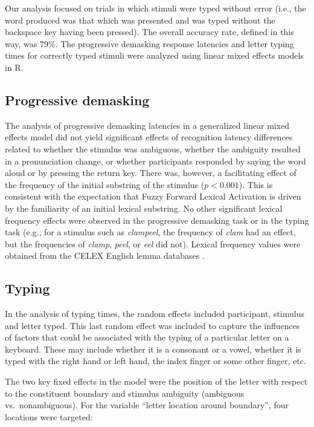 \documentclass[output=paper]{langsci/langscibook}
\begin{document}
Our analysis focused on trials in which stimuli were typed without error (i.e., the word produced was that which was presented and was typed without the backspace key having been pressed).  The overall accuracy rate, defined in this way, was 79\%. The progressive demasking response latencies and letter typing times for correctly typed stimuli were analyzed using linear mixed effects models in R.

\subsection{Progressive demasking}\label{sec:libben:3.1}

The analysis of progressive demasking latencies in a generalized linear mixed effects model did not yield significant effects of recognition latency differences related to whether the stimulus was ambiguous, whether the ambiguity resulted in a pronunciation change, or whether participants responded by saying the word aloud or by pressing the return key. There was, however, a facilitating effect of the frequency of the initial substring of the stimulus ($p<0.001$). This is consistent with the expectation that Fuzzy Forward Lexical Activation is driven by the familiarity of an initial lexical substring. No other significant lexical frequency effects were observed in the progressive demasking task or in the typing task (e.g., for a stimulus such as \textit{clampeel}, the frequency of \textit{clam} had an effect, but the frequencies of \textit{clamp}, \textit{peel}, or \textit{eel} did not). Lexical frequency values were obtained from the CELEX English lemma databases \citep{BaayenGulikers1995}.


\subsection{Typing}\label{sec:libben:3.2}
In the analysis of typing times, the random effects included participant, stimulus and letter typed. This last random effect was included to capture the influences of factors that could be associated with the typing of a particular letter on a keyboard. These may include whether it is a consonant or a vowel, whether it is typed with the right hand or left hand, the index finger or some other finger, etc.

The two key fixed effects in the model were the position of the letter with respect to the constituent boundary and stimulus ambiguity (ambiguous vs.\ nonambiguous). For the variable ``letter location around boundary'', four locations were targeted: 
\end{document}
